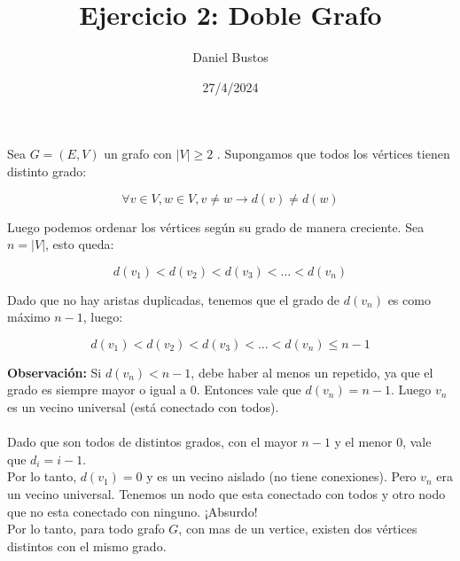 \documentclass{article}
\title{Ejercicio 2: Doble Grafo}
\author{Daniel Bustos}
\date{27/4/2024}
\begin{document}
\maketitle
Sea $G = (E,V)$ un grafo con $|V| \geq 2$ . Supongamos que todos los vértices tienen distinto grado:

\[
\forall v \in V, w \in V , v \neq w \rightarrow d(v) \neq d(w)
\]

Luego podemos ordenar los vértices según su grado de manera creciente. Sea $n = |V|$, esto queda:

\[
d(v_1) < d(v_2) < d(v_3) < \ldots < d(v_n)
\]

Dado que no hay aristas duplicadas, tenemos que el grado de $d(v_n)$ es como máximo $n - 1$, luego:

\[
d(v_1) < d(v_2) < d(v_3) < \ldots < d(v_n) \leq n-1
\]

\textbf{Observación:} Si $d(v_n) < n-1$, debe haber al menos un repetido, ya que el grado es siempre mayor o igual a 0. Entonces vale que $d(v_n) = n-1$. Luego $v_n$ es un vecino universal (está conectado con todos). \\ \\
Dado que son todos de distintos grados, con el mayor $n-1$ y el menor $0$, vale que $d_i = i-1$.\\

Por lo tanto, $d(v_1) = 0$ y es un vecino aislado (no tiene conexiones). Pero $v_n$ era un vecino universal. Tenemos un nodo que esta conectado con todos y otro nodo que no esta conectado con ninguno. ¡Absurdo!\\

Por lo tanto, para todo grafo $G$, con mas de un vertice, existen dos vértices distintos con el mismo grado.
\end{document}
